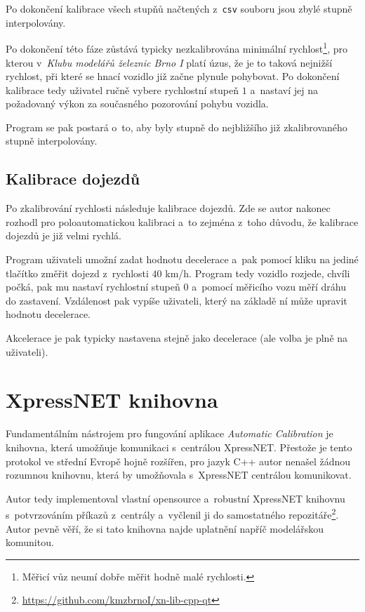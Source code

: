 Po dokončení kalibrace všech stupňů načtených z~\texttt{csv} souboru jsou zbylé
stupně interpolovány.

Po dokončení této fáze zůstává typicky nezkalibrována minimální
rychlost\footnote{Měřicí vůz neumí dobře měřit hodně malé rychlosti.}, pro kterou
v~\textit{Klubu modelářů železnic Brno I} platí úzus, že je to taková nejnižší
rychlost, při které se hnací vozidlo již začne plynule pohybovat. Po dokončení
kalibrace tedy uživatel ručně vybere rychlostní stupeň $1$ a~nastaví jej na
požadovaný výkon za současného pozorování pohybu vozidla.

Program se pak postará o~to, aby byly stupně do nejbližšího již zkalibrovaného
stupně interpolovány.

\subsection{Kalibrace dojezdů}

Po zkalibrování rychlosti následuje kalibrace dojezdů. Zde se autor nakonec
rozhodl pro poloautomatickou kalibraci a~to zejména z~toho důvodu, že kalibrace
dojezdů je již velmi rychlá.

Program uživateli umožní zadat hodnotu decelerace a~pak pomocí kliku na jediné
tlačítko změřit dojezd z~rychlosti $40$ km/h. Program tedy vozidlo rozjede,
chvíli počká, pak mu nastaví rychlostní stupeň $0$ a~pomocí měřicího vozu
měří dráhu do zastavení. Vzdálenost pak vypíše uživateli, který na základě
ní může upravit hodnotu decelerace.

Akcelerace je pak typicky nastavena stejně jako decelerace (ale volba je plně
na uživateli).

\section{XpressNET knihovna}
\label{sec:xn-lib}

Fundamentálním nástrojem pro fungování aplikace \textit{Automatic Calibration}
je knihovna, která umožňuje komunikaci s~centrálou XpressNET. Přestože je tento
protokol ve střední Evropě hojně rozšířen, pro jazyk C++ autor nenašel žádnou
rozumnou knihovnu, která by umožňovala s~XpressNET centrálou komunikovat.

Autor tedy implementoval vlastní opensource a~robustní XpressNET knihovnu
s~potvrzováním příkazů z~centrály a~vyčlenil ji do samostatného
repozitáře\footnote{\url{https://github.com/kmzbrnoI/xn-lib-cpp-qt}}. Autor
pevně věří, že si tato knihovna najde uplatnění napříč modelářskou komunitou.
